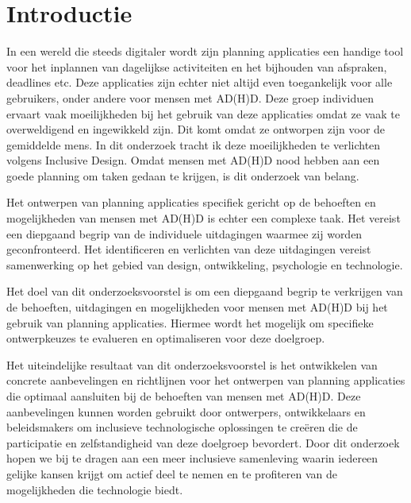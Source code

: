 
\section{Introductie}%
\label{sec:introductie}
In een wereld die steeds digitaler wordt zijn planning applicaties een handige tool voor het inplannen van dagelijkse activiteiten en het bijhouden van afspraken, deadlines etc. Deze applicaties zijn echter niet altijd even toegankelijk voor alle gebruikers, onder andere voor mensen met AD(H)D. Deze groep individuen ervaart vaak moeilijkheden bij het gebruik van deze applicaties omdat ze vaak te overweldigend en ingewikkeld zijn. Dit komt omdat ze ontworpen zijn voor de gemiddelde mens. In dit onderzoek tracht ik deze moeilijkheden te verlichten volgens Inclusive Design. Omdat mensen met AD(H)D nood hebben aan een goede planning om taken gedaan te krijgen, is dit onderzoek van belang. \newline 

Het ontwerpen van planning applicaties specifiek gericht op de behoeften en mogelijkheden van mensen met AD(H)D is echter een complexe taak. Het vereist een diepgaand begrip van de individuele uitdagingen waarmee zij worden geconfronteerd. Het identificeren en verlichten van deze uitdagingen vereist samenwerking op het gebied van design, ontwikkeling, psychologie en technologie. \newline 

Het doel van dit onderzoeksvoorstel is om een diepgaand begrip te verkrijgen van de behoeften, uitdagingen en mogelijkheden voor mensen met AD(H)D bij het gebruik van planning applicaties. Hiermee wordt het mogelijk om specifieke ontwerpkeuzes te evalueren en optimaliseren voor deze doelgroep. \newline 

Het uiteindelijke resultaat van dit onderzoeksvoorstel is het ontwikkelen van concrete aanbevelingen en richtlijnen voor het ontwerpen van planning applicaties die optimaal aansluiten bij de behoeften van mensen met AD(H)D. Deze aanbevelingen kunnen worden gebruikt door ontwerpers, ontwikkelaars en beleidsmakers om inclusieve technologische oplossingen te creëren die de participatie en zelfstandigheid van deze doelgroep bevordert.
Door dit onderzoek hopen we bij te dragen aan een meer inclusieve samenleving waarin iedereen gelijke kansen krijgt om actief deel te nemen en te profiteren van de mogelijkheden die technologie biedt.



